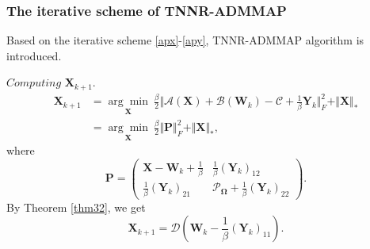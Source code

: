 \documentclass{article}
\begin{document}
{%

\subsubsection{The iterative scheme of TNNR-ADMMAP}
Based on the iterative scheme \eqref{apx}-\eqref{apy}, TNNR-ADMMAP algorithm is introduced.

$\textit{Computing}$  $\mathbf X_{k+1}$.
\begin{equation}
    \begin{aligned}
            \mathbf X_{k+1} & = \underset{\mathbf X}{\arg\min}\ \frac{\beta}{2}\Vert \mathcal{A}(\mathbf X) + \mathcal{B}(\mathbf W_k) - \mathcal{C} + \frac{1}{\beta}\mathbf Y_{k} \Vert_F^2 + \Vert\mathbf X \Vert_* \\
            & = \underset{\mathbf X}{\arg\min}\ \frac{\beta}{2}\Vert \mathbf P \Vert^2_F + \Vert\mathbf X \Vert_*,
    \end{aligned}
\end{equation}
where 
\begin{equation*}
    \mathbf P = \begin{pmatrix}
        \mathbf X- \mathbf W_k + \frac{1}{\beta} & \frac{1}{\beta} (\mathbf Y_k)_{12} \\
        \frac{1}{\beta}(\mathbf Y_k)_{21} & \mathcal{P}_{\mathbf\Omega} + \frac{1}{\beta}(\mathbf Y_k)_{22}
    \end{pmatrix}.
\end{equation*}
By Theorem \eqref{thm32}, we get
\begin{equation}
    \mathbf X_{k+1} = \mathcal{D}\left(\mathbf W_k - \frac{1}{\beta}(\mathbf Y_k)_{11}\right).
\end{equation}

}
\end{document}
